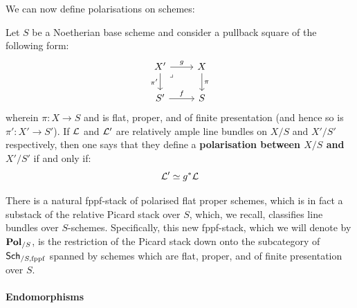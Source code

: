                     We can now define polarisations on schemes:
                    \begin{definition}[Polarisations] \label{def: polarisations}
                        Let $S$ be a Noetherian base scheme and consider a pullback square of the following form:
                            $$
                                \begin{tikzcd}
                                	{X'} & X \\
                                	{S'} & S
                                	\arrow["g", from=1-1, to=1-2]
                                	\arrow["{\pi'}"', from=1-1, to=2-1]
                                	\arrow["\pi", from=1-2, to=2-2]
                                	\arrow["f", from=2-1, to=2-2]
                                	\arrow["\lrcorner"{anchor=center, pos=0.125}, draw=none, from=1-1, to=2-2]
                                \end{tikzcd}
                            $$
                        wherein $\pi: X \to S$ and is flat, proper, and of finite presentation (and hence so is $\pi': X' \to S'$). If $\mathcal{L}$ and $\mathcal{L}'$ are relatively ample line bundles on $X/S$ and $X'/S'$ respectively, then one says that they define a \textbf{polarisation between $X/S$ and $X'/S'$} if and only if:
                            $$\mathcal{L}' \simeq g^*\mathcal{L}$$
                    \end{definition}
                    \begin{remark} \label{remark: stack_of_polarisations}
                        There is a natural fppf-stack of polarised flat proper schemes, which is in fact a substack of the relative Picard stack over $S$, which, we recall, classifies line bundles over $S$-schemes. Specifically, this new fppf-stack, which we will denote by $\mathbf{Pol}_{/S}$, is the restriction of the Picard stack down onto the subcategory of $\mathsf{Sch}_{/S, \mathrm{fppf}}$ spanned by schemes which are flat, proper, and of finite presentation over $S$.
                    \end{remark}
                    \begin{remark} \label{remark: stack_of_polarisations_on_abelian_schemes}
                        
                    \end{remark}
                
                \paragraph{Endomorphisms}
                
